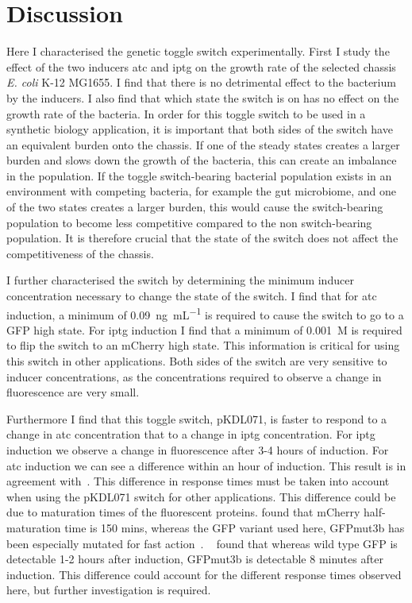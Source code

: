 \section{Discussion}

Here I characterised the genetic toggle switch experimentally. First I study the effect of the two inducers \acrshort{atc} and \acrshort{iptg} on the growth rate of the selected chassis \textit{E. coli} K-12 MG1655. I find that there is no detrimental effect to the bacterium by the inducers. I also find that which state the switch is on has no effect on the growth rate of the bacteria. In order for this toggle switch to be used in a synthetic biology application, it is important that both sides of the switch have an equivalent burden onto the chassis. If one of the steady states creates a larger burden and slows down the growth of the bacteria, this can create an imbalance in the population. If the toggle switch-bearing bacterial population exists in an environment with competing bacteria, for example the gut microbiome, and one of the two states creates a larger burden, this would cause the switch-bearing population to become less competitive compared to the non switch-bearing population. It is therefore crucial that the state of the switch does not affect the competitiveness of the chassis.  


I further characterised the switch by determining the minimum inducer concentration necessary to change the state of the switch. I find that for \acrshort{atc} induction, a minimum of \SI{0.09}{\nano\gram\per\milli\liter} is required to cause the switch to go to a GFP high state. For \acrshort{iptg} induction I find that a minimum of \SI{0.001}{M} is required to flip the switch to an mCherry high state. This information is critical for using this switch in other applications. Both sides of the switch are very sensitive to inducer concentrations, as the concentrations required to observe a change in fluorescence are very small. 

Furthermore I find that this toggle switch, pKDL071, is faster to respond to a change in \acrshort{atc} concentration that to a change in \acrshort{iptg} concentration. For \acrshort{iptg} induction we observe a change in fluorescence after 3-4 hours of induction. For \acrshort{atc} induction we can see a difference within an hour of induction. This result is in agreement with~\textcite{Litcofsky:2012gr}. This difference in response times must be taken into account when using the pKDL071 switch for other applications. This difference could be due to maturation times of the fluorescent proteins. \textcite{Macdonald:2012el} found that mCherry half-maturation time is 150 mins, whereas the GFP variant used here, GFPmut3b has been especially mutated for fast action~\autocite{Cormack:1996gv}. ~\textcite{Cormack:1996gv} found that whereas wild type GFP is detectable 1-2 hours after induction, GFPmut3b is detectable 8 minutes after induction. This difference could account for the different response times observed here, but further investigation is required. 

